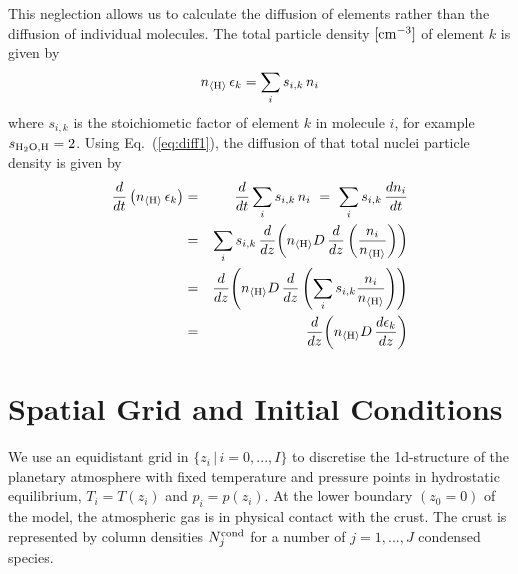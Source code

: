 \documentclass[11pt]{article}
\def\nH{n_{\langle\rm H\rangle}}
\def\ek{\epsilon_k}
\begin{document}
This neglection allows us to calculate the diffusion of elements
rather than the diffusion of individual molecules.
The total particle density $\rm[cm^{-3}]$ of element $k$ is given by 
\begin{equation}
  \nH\,\ek = \sum_i s_{i,k}\,n_i
\end{equation} 
where $s_{i,k}$ is the stoichiometic factor of element $k$ in molecule
$i$, for example $s_{\rm H_2O,H}=2$. Using Eq.~(\ref{eq:diff1}), the
diffusion of that total nuclei particle density is given by
\begin{eqnarray}
  \frac{d}{dt}\left(\nH\,\ek\right)
  &=& \frac{d}{dt}\sum_i s_{i,k}\,n_i
  ~=~ \sum_i s_{i,k}\,\frac{dn_i}{dt} \\
  &=& \sum_i s_{i,k}\,\frac{d}{dz}\!\left(\nH D\,\frac{d}{dz}
                     \left(\frac{n_i}{\nH}\right)\right) \\
  &=& \frac{d}{dz}\!\left(\nH D\,\frac{d}{dz}\left(\sum_i s_{i,k}
  \frac{n_i}{\nH}\right)\right) \\
  &=& \frac{d}{dz}\!\left(\nH D\,\frac{d\ek}{dz}\right)
\end{eqnarray}




\section{Spatial Grid and Initial Conditions}
\label{sec:init}

We use an equidistant grid in $\{z_i\,|\,i\!=\!0,...,I\}$ to
discretise the 1d-structure of the planetary atmosphere with fixed
temperature and pressure points in hydrostatic equilibrium, $T_i=T(z_i)$
and $p_i=p(z_i)$.  At the lower boundary $(z_0=0)$ of the model, the
atmospheric gas is in physical contact with the crust. The crust is
represented by column densities $N_j^{\rm cond}$ for a number of
$j=1,...,J$ condensed species.
\end{document}
